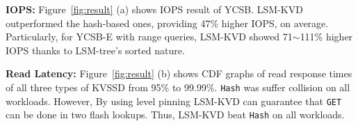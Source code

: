 \documentclass{abstract_hutech}
\newcommand{\ours}{LSM-KVD}
\begin{document}
\textbf{IOPS:}
Figure~\ref{fig:result} (a) shows IOPS result of YCSB.
\ours{} outperformed the
hash-based ones, providing 47\% higher IOPS, on average. Particularly, for
YCSB-E with range queries, \ours{} showed 71$\sim$111\% higher IOPS thanks to
LSM-tree's sorted nature. 

%
\textbf{Read Latency:}
Figure~\ref{fig:result} (b) shows CDF graphs of read response times of all three types of KVSSD from 95\% to 99.99\%.
\texttt{Hash} was suffer collision on all workloads. 
However, By using level pinning \ours{} can guarantee that \texttt{GET} can be done in two flash lookups.
Thus, \ours{} beat \texttt{Hash} on all workloads.
\vspace{-5pt}


\end{document}

